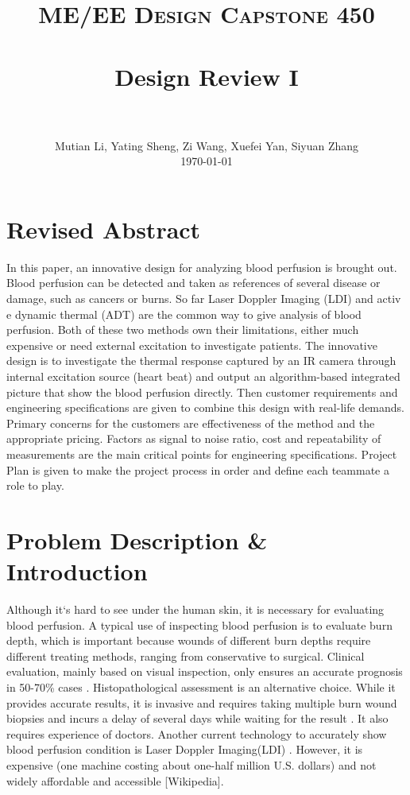 \documentclass[paper=letter, fontsize=11pt]{scrartcl}
\title{
		\vspace{-1in} 	
		\usefont{OT1}{bch}{b}{n}
		\normalfont \normalsize \textsc{ME/EE Design Capstone 450} \\ [25pt]
		\horrule{0.5pt} \\[0.4cm]
		\huge Design Review I \\
		\horrule{2pt} \\[0.5cm]
}
\author{
        \normalfont 							
        \normalsize
        Mutian Li, Yating Sheng, Zi Wang, Xuefei Yan, Siyuan Zhang\\[3pt]
        \today
}
\date{}
\numberwithin{equation}{section}		%
\numberwithin{figure}{section}			%
\numberwithin{table}{section}			%
\begin{document}
\maketitle
\tableofcontents
\pagebreak

\section{Revised Abstract}
In this paper, an innovative design for analyzing blood perfusion is brought out. Blood perfusion can be detected and
taken as references of several disease or damage, such as cancers or burns. So far Laser Doppler Imaging (LDI) and activ
e dynamic thermal (ADT) are the common way to give analysis of blood perfusion.  Both of these two methods own their 
limitations, either much expensive or need external excitation to investigate patients. The innovative design is to 
investigate the thermal response captured by an IR camera through internal excitation source (heart beat) and output an 
algorithm-based integrated picture that show the blood perfusion directly. Then customer requirements and engineering 
specifications are given to combine this design with real-life demands. Primary concerns for the customers are effectiveness
of the method and the appropriate pricing. Factors as signal to noise ratio, cost and repeatability of measurements are the
main critical points for engineering specifications. Project Plan is given to make the project process in order and define 
each teammate a role to play. 

\section{Problem Description \& Introduction}

Although it`s hard to see under the human skin, it is necessary for evaluating blood perfusion.
A typical use of inspecting blood perfusion is to evaluate burn depth, which is important because wounds of different 
burn depths require different treating methods, ranging from conservative to surgical. Clinical evaluation,
mainly based on visual inspection, only ensures an accurate prognosis in 50-70\% cases \cite{Renkielska}. Histopathological
assessment is an alternative choice. While it provides accurate results, it is invasive and requires taking multiple
burn wound biopsies and incurs a delay of several days while waiting for the result \cite{Renkielska}. It also requires 
experience of doctors. Another current technology to accurately show
blood perfusion condition is Laser Doppler Imaging(LDI) \cite{Pape}. However, it is expensive (one machine costing
about one-half million U.S. dollars) and not widely affordable and accessible [Wikipedia].
\end{document}
